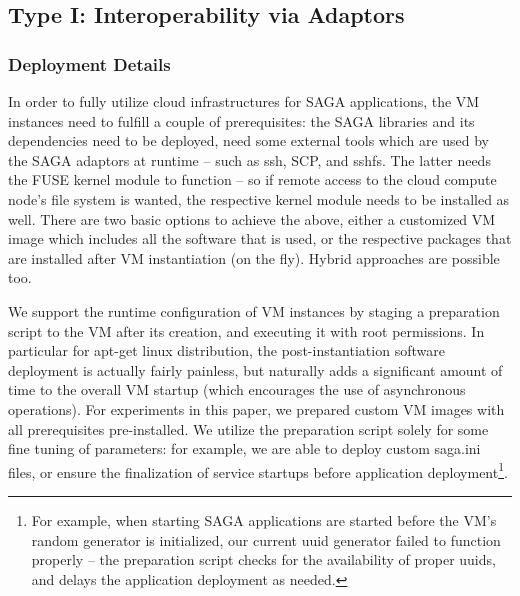 \documentclass[3p,twocolumn]{elsarticle}
\begin{document}
\subsection{Type I: Interoperability via Adaptors}

\subsubsection{Deployment Details}

In order to fully utilize cloud infrastructures for SAGA applications,
the VM instances need to fulfill a couple of prerequisites: the SAGA
libraries and its dependencies need to be deployed, need some external
tools which are used by the SAGA adaptors at runtime -- such as ssh,
SCP, and sshfs.  The latter needs the FUSE kernel module to function
-- so if remote access to the cloud compute node's file system is
wanted, the respective kernel module needs to be installed as well.
There are two basic options to achieve the above, either a customized
VM image which includes all the software that is used, or the
respective packages that are installed after VM instantiation (on the
fly).  Hybrid approaches are possible too.

We support the runtime configuration of VM instances by staging a
preparation script to the VM after its creation, and executing it with
root permissions.  In particular for apt-get linux distribution, the
post-instantiation software deployment is actually fairly painless,
but naturally adds a significant amount of time to the overall VM
startup (which encourages the use of asynchronous operations).
For experiments in this paper, we prepared custom VM images with all
prerequisites pre-installed.  We utilize the preparation script solely
for some fine tuning of parameters: for example, we are able to deploy
custom saga.ini files, or ensure the finalization of service startups
before application deployment\footnote{For example, when starting SAGA
  applications are started before the VM's random generator is
  initialized, our current uuid generator failed to function properly
  -- the preparation script checks for the availability of proper
  uuids, and delays the application deployment as needed.}.
\end{document}
